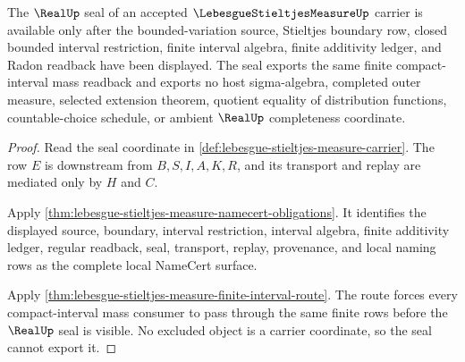\begin{theorem}
\label{thm:lebesgue-stieltjes-measure-real-seal}
The $\RealUp$ seal of an accepted $\LebesgueStieltjesMeasureUp$ carrier is available only after the bounded-variation source, Stieltjes boundary row, closed bounded interval restriction, finite interval algebra, finite additivity ledger, and Radon readback have been displayed. The seal exports the same finite compact-interval mass readback and exports no host sigma-algebra, completed outer measure, selected extension theorem, quotient equality of distribution functions, countable-choice schedule, or ambient $\RealUp$ completeness coordinate.
\end{theorem}
\begin{proof}
Read the seal coordinate in \autoref{def:lebesgue-stieltjes-measure-carrier}. The row $E$ is downstream from $B,S,I,A,K,R$, and its transport and replay are mediated only by $H$ and $C$.

Apply \autoref{thm:lebesgue-stieltjes-measure-namecert-obligations}. It identifies the displayed source, boundary, interval restriction, interval algebra, finite additivity ledger, regular readback, seal, transport, replay, provenance, and local naming rows as the complete local NameCert surface.

Apply \autoref{thm:lebesgue-stieltjes-measure-finite-interval-route}. The route forces every compact-interval mass consumer to pass through the same finite rows before the $\RealUp$ seal is visible. No excluded object is a carrier coordinate, so the seal cannot export it.
\end{proof}


